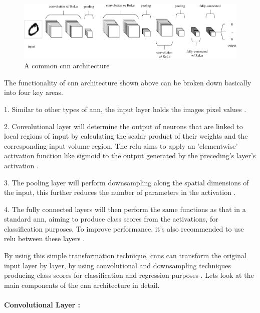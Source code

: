 \begin{figure}[ht!]
    \centering
    \includegraphics[width=1.1\linewidth]{Rohit_Master_Thesis//Images/cnn_architecture.pdf}
    \caption{A common \gls{cnn} architecture \cite{oshea2015introductionconvolutionalneuralnetworks}}
    \label{fig:cnn architecture}
\end{figure}

The functionality of \gls{cnn} architecture shown above can be broken down basically into four key areas.

1. Similar to other types of \gls{ann}, the input layer holds the images pixel values \cite{oshea2015introductionconvolutionalneuralnetworks}.

2. Convolutional layer will determine the output of neurons that are linked to local regions of input by calculating the scalar product of their weights and the corresponding input volume region. The \gls{relu} aims to apply an 'elementwise' activation function like sigmoid to the output generated by the preceding's layer's activation \cite{oshea2015introductionconvolutionalneuralnetworks}.

3. The pooling layer will perform downsampling along the spatial dimensions of the input, this further reduces the number of parameters in the activation \cite{oshea2015introductionconvolutionalneuralnetworks}.

4. The fully connected layers will then perform the same functions as that in a standard \gls{ann}, aiming to produce class scores from the activations, for classification purposes. To improve performance, it's also recommended to use \gls{relu} between these layers \cite{oshea2015introductionconvolutionalneuralnetworks}. 

By using this simple transformation technique, \glspl{cnn} can transform the original input layer by layer, by using convolutional and downsampling techniques producing class scores for classification and regression purposes \cite{oshea2015introductionconvolutionalneuralnetworks}. Lets look at the main components of the \gls{cnn} architecture in detail.

\paragraph*{Convolutional Layer :}

